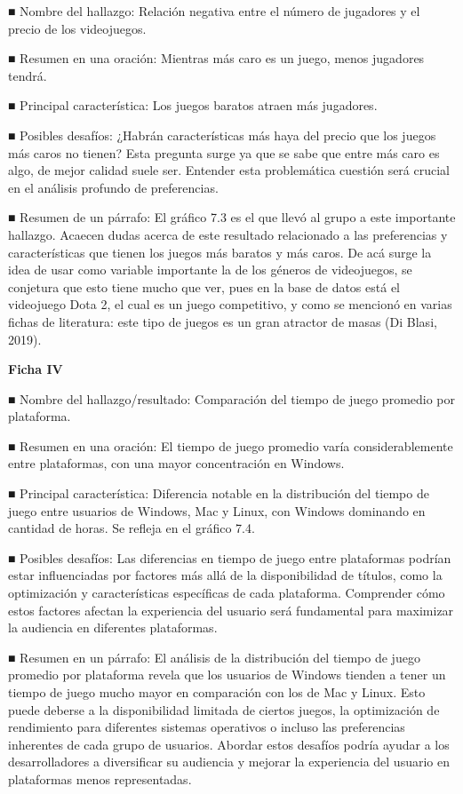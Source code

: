 \documentclass[
  letterpaper,
  DIV=11,
  numbers=noendperiod]{scrreprt}
\begin{document}
■ Nombre del hallazgo: Relación negativa entre el número de jugadores y
el precio de los videojuegos.

■ Resumen en una oración: Mientras más caro es un juego, menos jugadores
tendrá.

■ Principal característica: Los juegos baratos atraen más jugadores.

■ Posibles desafíos: ¿Habrán características más haya del precio que los
juegos más caros no tienen? Esta pregunta surge ya que se sabe que entre
más caro es algo, de mejor calidad suele ser. Entender esta problemática
cuestión será crucial en el análisis profundo de preferencias.

■ Resumen de un párrafo: El gráfico 7.3 es el que llevó al grupo a este
importante hallazgo. Acaecen dudas acerca de este resultado relacionado
a las preferencias y características que tienen los juegos más baratos y
más caros. De acá surge la idea de usar como variable importante la de
los géneros de videojuegos, se conjetura que esto tiene mucho que ver,
pues en la base de datos está el videojuego Dota 2, el cual es un juego
competitivo, y como se mencionó en varias fichas de literatura: este
tipo de juegos es un gran atractor de masas (Di Blasi, 2019).

\textbf{Ficha IV}

■ Nombre del hallazgo/resultado: Comparación del tiempo de juego
promedio por plataforma.

■ Resumen en una oración: El tiempo de juego promedio varía
considerablemente entre plataformas, con una mayor concentración en
Windows.

■ Principal característica: Diferencia notable en la distribución del
tiempo de juego entre usuarios de Windows, Mac y Linux, con Windows
dominando en cantidad de horas. Se refleja en el gráfico 7.4.

■ Posibles desafíos: Las diferencias en tiempo de juego entre
plataformas podrían estar influenciadas por factores más allá de la
disponibilidad de títulos, como la optimización y características
específicas de cada plataforma. Comprender cómo estos factores afectan
la experiencia del usuario será fundamental para maximizar la audiencia
en diferentes plataformas.

■ Resumen en un párrafo: El análisis de la distribución del tiempo de
juego promedio por plataforma revela que los usuarios de Windows tienden
a tener un tiempo de juego mucho mayor en comparación con los de Mac y
Linux. Esto puede deberse a la disponibilidad limitada de ciertos
juegos, la optimización de rendimiento para diferentes sistemas
operativos o incluso las preferencias inherentes de cada grupo de
usuarios. Abordar estos desafíos podría ayudar a los desarrolladores a
diversificar su audiencia y mejorar la experiencia del usuario en
plataformas menos representadas.
\end{document}
